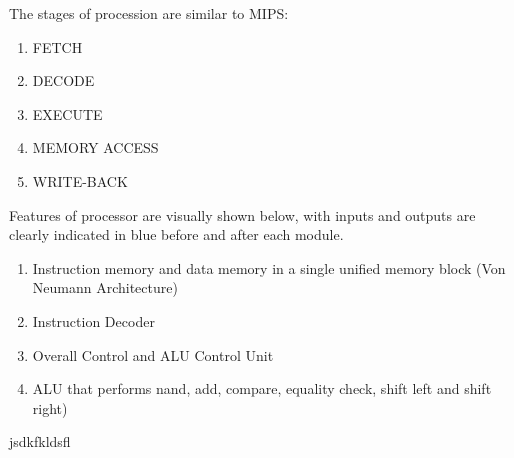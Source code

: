 \documentclass[11pt, titlepage]{article}
\begin{document}
The stages of procession are similar to MIPS:
\begin{enumerate}
\item FETCH
\item DECODE
\item EXECUTE
\item MEMORY ACCESS
\item WRITE-BACK
\end{enumerate}
Features of processor are visually shown below, with inputs and outputs are clearly indicated in blue before and after each module. 

\begin{enumerate}
  \item Instruction memory and data memory in a single unified memory block (Von Neumann Architecture)
  \item Instruction Decoder
  \item Overall Control and ALU Control Unit 
  \item ALU that performs nand, add, compare, equality check, shift left and shift right)
\end{enumerate}
\newpage
jsdkfkldsfl

\newpage
\end{document}
